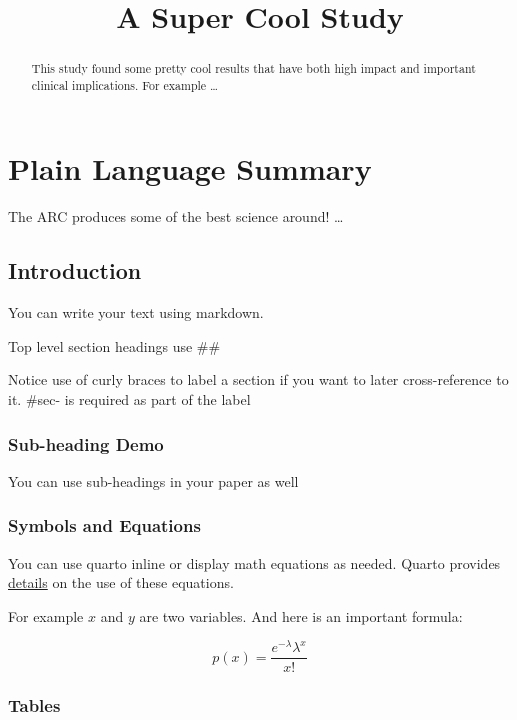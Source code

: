 \documentclass[
]{agujournal2019}
\begin{document}
\title{A Super Cool Study}



\begin{abstract}
This study found some pretty cool results that have both high impact and
important clinical implications. For example \ldots{}
\end{abstract}

\section*{Plain Language Summary}
The ARC produces some of the best science around! \ldots{}



\subsection{Introduction}\label{sec-intro}

You can write your text using markdown.

Top level section headings use \#\#

Notice use of curly braces to label a section if you want to later
cross-reference to it. \#sec- is required as part of the label

\subsubsection{Sub-heading Demo}\label{sub-heading-demo}

You can use sub-headings in your paper as well

\subsubsection{Symbols and Equations}\label{symbols-and-equations}

You can use quarto inline or display math equations as needed. Quarto
provides
\href{https://quarto.org/docs/authoring/markdown-basics.html\#equations}{details}
on the use of these equations.

For example \(x\) and \(y\) are two variables. And here is an important
formula:

\[
p(x) = \frac{e^{-\lambda} \lambda^{x}}{x !}
\]

\subsubsection{Tables}\label{tables}
\end{document}
